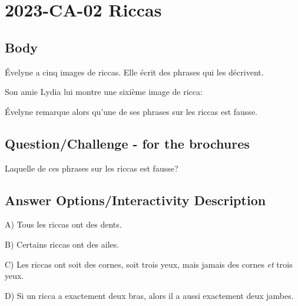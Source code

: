 \documentclass[a4paper,11pt]{report}
\newcommand{\taskGraphicsFolder}{..}
\begin{document}
\section*{\centering{} 2023-CA-02 Riccas}


\subsection*{Body}

Évelyne a cinq images de riccas. Elle écrit des phrases qui les décrivent.

\raisebox{-0.5ex}{}
\raisebox{-0.5ex}{}
\raisebox{-0.5ex}{}
\raisebox{-0.5ex}{}
\raisebox{-0.5ex}{}

Son amie Lydia lui montre une sixième image de ricca:

{\centering%
\par}

Évelyne remarque alors qu’une de ses phrases sur les riccas est fausse.

{\em


\subsection*{Question/Challenge - for the brochures}

Laquelle de ces phrases sur les riccas est fausse?

}

\begingroup
\renewcommand{\arraystretch}{1.5}
\subsection*{Answer Options/Interactivity Description}

A) Tous les riccas ont des dents.

B) Certains riccas ont des ailes.

C) Les riccas ont soit des cornes, soit trois yeux, mais jamais des cornes \emph{et} trois yeux.

D) Si un ricca a exactement deux bras, alors il a aussi exactement deux jambes.
\end{document}
